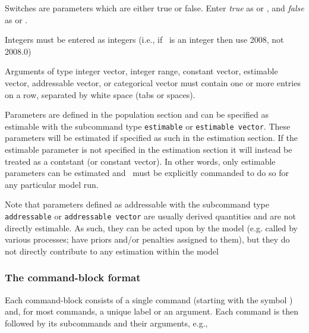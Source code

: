 Switches are parameters which are either true or false. Enter \emph{true} as  or , and \emph{false} as  or . 

Integers must be entered as integers (i.e., if \ is an integer then use 2008, not 2008.0)

Arguments of type integer vector, integer range, constant vector, estimable vector, addressable vector, or categorical vector must contain one or more entries on a row, separated by white space (tabs or spaces). 

Parameters are defined in the population section and can be specified as estimable with the subcommand type \texttt{estimable} or \texttt{estimable vector}.  These parameters will be estimated if specified as such in the estimation section. If the estimable parameter is not specified in the estimation section it will instead be treated as a contstant (or constant vector). In other words, only estimable parameters can be estimated and \CNAME\ must be explicitly commanded to do so for any particular model run. 

Note that parameters defined as addressable with the subcommand type \texttt{addressable} or \texttt{addressable vector} are usually derived quantities and are not directly estimable. As such, they can be acted upon by the model (e.g. called by various processes; have priors and/or penalties assigned to them), but they do not directly contribute to any estimation within the model

\subsubsection{The command-block format}
Each command-block consists of a single command (starting with the symbol \command{}) and, for most commands, a unique label or an argument. Each command is then followed by its subcommands and their arguments, e.g., 


